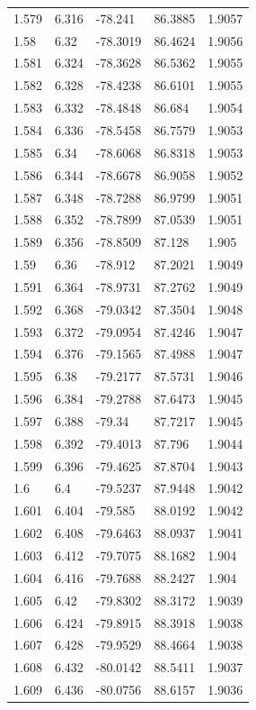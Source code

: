 \begin{tabular}{lllll}
1.579 & 6.316 & -78.241 & 86.3885 & 1.9057 \\
1.58 & 6.32 & -78.3019 & 86.4624 & 1.9056 \\
1.581 & 6.324 & -78.3628 & 86.5362 & 1.9055 \\
1.582 & 6.328 & -78.4238 & 86.6101 & 1.9055 \\
1.583 & 6.332 & -78.4848 & 86.684 & 1.9054 \\
1.584 & 6.336 & -78.5458 & 86.7579 & 1.9053 \\
1.585 & 6.34 & -78.6068 & 86.8318 & 1.9053 \\
1.586 & 6.344 & -78.6678 & 86.9058 & 1.9052 \\
1.587 & 6.348 & -78.7288 & 86.9799 & 1.9051 \\
1.588 & 6.352 & -78.7899 & 87.0539 & 1.9051 \\
1.589 & 6.356 & -78.8509 & 87.128 & 1.905 \\
1.59 & 6.36 & -78.912 & 87.2021 & 1.9049 \\
1.591 & 6.364 & -78.9731 & 87.2762 & 1.9049 \\
1.592 & 6.368 & -79.0342 & 87.3504 & 1.9048 \\
1.593 & 6.372 & -79.0954 & 87.4246 & 1.9047 \\
1.594 & 6.376 & -79.1565 & 87.4988 & 1.9047 \\
1.595 & 6.38 & -79.2177 & 87.5731 & 1.9046 \\
1.596 & 6.384 & -79.2788 & 87.6473 & 1.9045 \\
1.597 & 6.388 & -79.34 & 87.7217 & 1.9045 \\
1.598 & 6.392 & -79.4013 & 87.796 & 1.9044 \\
1.599 & 6.396 & -79.4625 & 87.8704 & 1.9043 \\
1.6 & 6.4 & -79.5237 & 87.9448 & 1.9042 \\
1.601 & 6.404 & -79.585 & 88.0192 & 1.9042 \\
1.602 & 6.408 & -79.6463 & 88.0937 & 1.9041 \\
1.603 & 6.412 & -79.7075 & 88.1682 & 1.904 \\
1.604 & 6.416 & -79.7688 & 88.2427 & 1.904 \\
1.605 & 6.42 & -79.8302 & 88.3172 & 1.9039 \\
1.606 & 6.424 & -79.8915 & 88.3918 & 1.9038 \\
1.607 & 6.428 & -79.9529 & 88.4664 & 1.9038 \\
1.608 & 6.432 & -80.0142 & 88.5411 & 1.9037 \\
1.609 & 6.436 & -80.0756 & 88.6157 & 1.9036 \\

\end{tabular}
